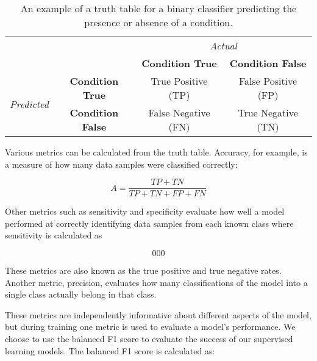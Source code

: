 \begin{table}[]
\caption{An example of a truth table for a binary classifier predicting the presence or absence of a condition.}
\label{ch4:tab:truthtable}
\begin{tabular}{cc|c|c|}
\cline{3-4}
\multicolumn{2}{c}{\multirow{2}{*}{}}                                                & \multicolumn{2}{|c|}{\textit{Actual}}               \\ \cline{3-4} 
\multicolumn{2}{c|}{}                                                                 & \textbf{Condition True} & \textbf{Condition False} \\ \hline
\multicolumn{1}{|c|}{\multirow{2}{*}{\textit{Predicted}}} & \textbf{Condition True}  & True Positive (TP)      & False Positive (FP)      \\ \cline{2-4} 
\multicolumn{1}{|c|}{}                                    & \textbf{Condition False} & False Negative (FN)     & True Negative (TN)       \\ \hline
\end{tabular}
\end{table}

Various metrics can be calculated from the truth table. Accuracy, for example, is a measure of how many data samples were classified correctly:

\begin{equation}
A = \frac{TP+TN}{TP+TN+FP+FN}
\end{equation}

\noindent Other metrics such as sensitivity and specificity evaluate how well a model performed at correctly identifying data samples from each known class where sensitivity is calculated as

\begin{equation}
000
\end{equation}

These metrics are also known as the true positive and true negative rates. Another metric, precision, evaluates how many classifications of the model into a single class actually belong in that class.

These metrics are independently informative about different aspects of the model, but during training one metric is used to evaluate a model's performance. We choose to use the balanced F1 score to evaluate the success of our supervised learning models. The balanced F1 score is calculated as:

